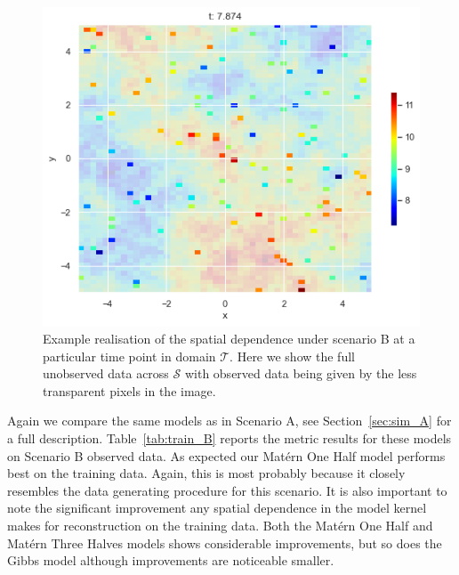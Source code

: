 \begin{figure}
	\centering
	\includegraphics[width=\textwidth]{ex_spa_B}
	\caption[An example realisation of the spatial dependence under Scenario B at a particular time point.]{Example realisation of the spatial dependence under scenario B at a particular time point in domain $\mathcal{T}$. Here we show the full unobserved data across $\mathcal{S}$ with observed data being given by the less transparent pixels in the image.}
	\label{fig:ex_spa_B}
\end{figure}

Again we compare the same models as in Scenario A, see Section~\ref{sec:sim_A} for a full description.
Table~\ref{tab:train_B} reports the metric results for these models on Scenario B observed data.
As expected our Mat\'ern One Half model performs best on the training data.
Again, this is most probably because it closely resembles the data generating procedure for this scenario.
It is also important to note the significant improvement any spatial dependence in the model kernel makes for reconstruction on the training data.
Both the Mat\'ern One Half and Mat\'ern Three Halves models shows considerable improvements, but so does the Gibbs model although improvements are noticeable smaller.


